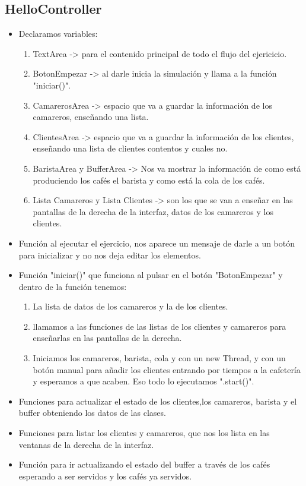 \documentclass[a4paper,12pt]{article}
\begin{document}
\subsection{HelloController}
\begin{itemize}
\item Declaramos variables:
    \begin{enumerate}
        \item TextArea -> para el contenido principal de todo el flujo del ejericicio.
        \item BotonEmpezar -> al darle inicia la simulación y llama a la función "iniciar()".
        \item CamarerosArea -> espacio que va a guardar la información de los camareros, enseñando una lista.
        \item ClientesArea -> espacio que va a guardar la información de los clientes, enseñando una lista de clientes contentos y cuales no.
        \item BaristaArea y BufferArea -> Nos va mostrar la información de como está produciendo los cafés el barista y como está la cola de los cafés.
        \item Lista Camareros y Lista Clientes -> son los que se van a enseñar en las pantallas de la derecha de la interfaz, datos de los camareros y los clientes.
    \end{enumerate}
\item Función al ejecutar el ejercicio, nos aparece un mensaje de darle a un botón para inicializar y no nos deja editar los elementos.
\item Función "iniciar()" que funciona al pulsar en el botón "BotonEmpezar" y dentro de la función tenemos:
    \begin{enumerate}
        \item La lista de datos de los camareros y la de los clientes.
        \item llamamos a las funciones de las listas de los clientes y camareros para enseñarlas en las pantallas de la derecha.
        \item Iniciamos los camareros, barista, cola y con un new Thread, y con un botón manual para añadir los clientes entrando por tiempos a la cafetería y esperamos a que acaben. Eso todo lo ejecutamos ".start()".
    \end{enumerate}
\item Funciones para actualizar el estado de los clientes,los camareros, barista y el buffer obteniendo los datos de las clases. 
\item Funciones para listar los clientes y camareros, que nos los lista en las ventanas de la derecha de la interfaz.
\item Función para ir actualizando el estado del buffer a través de los cafés esperando a ser servidos y los cafés ya servidos.
\end{itemize}
\end{document}
